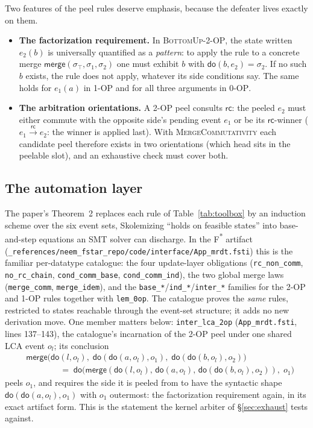 \documentclass[11pt]{article}
\newcommand{\rc}{\xrightarrow{\mathsf{rc}}}
\newcommand{\rcrel}{\mathsf{rc}}
\newcommand{\mergeL}{\mathsf{merge}}
\newcommand{\lean}[1]{\texttt{#1}}
\begin{document}
Two features of the peel rules deserve emphasis, because the defeater
lives exactly on them.

\begin{itemize}[leftmargin=2em]
\item \textbf{The factorization requirement.} In
  \textsc{BottomUp-2-OP}, the state written $e_2(b)$ is universally
  quantified as a \emph{pattern}: to apply the rule to a concrete merge
  $\mergeL(\sigma_\top, \sigma_1, \sigma_2)$ one must exhibit $b$ with
  $\mathsf{do}(b, e_2) = \sigma_2$. If no such $b$ exists, the rule
  does not apply, whatever its side conditions say. The same holds for
  $e_1(a)$ in \textsc{1-OP} and for all three arguments in
  \textsc{0-OP}.
\item \textbf{The arbitration orientations.} A \textsc{2-OP} peel
  consults $\rcrel$: the peeled $e_2$ must either commute with the
  opposite side's pending event $e_1$ or be its $\rcrel$-winner
  ($e_1 \rc e_2$: the winner is applied last). With
  \textsc{MergeCommutativity} each candidate peel therefore exists in
  two orientations (which head sits in the peelable slot), and an
  exhaustive check must cover both.
\end{itemize}

\subsection{The automation layer}

The paper's Theorem~2 replaces each rule of Table~\ref{tab:toolbox} by
an induction scheme over the six event sets, Skolemizing ``holds on
feasible states'' into base-and-step equations an SMT solver can
discharge. In the F\textsuperscript{*} artifact
(\lean{\_references/neem\_fstar\_repo/code/interface/App\_mrdt.fsti})
this is the familiar per-datatype catalogue: the four update-layer
obligations (\lean{rc\_non\_comm}, \lean{no\_rc\_chain},
\lean{cond\_comm\_base}, \lean{cond\_comm\_ind}), the two global merge
laws (\lean{merge\_comm}, \lean{merge\_idem}), and the
\lean{base\_*}/\lean{ind\_*}/\lean{inter\_*} families for the
\textsc{2-OP} and \textsc{1-OP} rules together with \lean{lem\_0op}.
The catalogue proves the \emph{same} rules, restricted to states
reachable through the event-set structure; it adds no new derivation
move. One member matters below: \lean{inter\_lca\_2op}
(\lean{App\_mrdt.fsti}, lines 137--143), the catalogue's incarnation of
the \textsc{2-OP} peel under one shared LCA event $o_l$; its conclusion
\begin{align*}
  &\mergeL\bigl(\mathsf{do}(l, o_l),\;
    \mathsf{do}(\mathsf{do}(a, o_l), o_1),\;
    \mathsf{do}(\mathsf{do}(b, o_l), o_2)\bigr) \\
  &\qquad\qquad =\;
  \mathsf{do}\bigl(\mergeL(\mathsf{do}(l, o_l),\,
    \mathsf{do}(a, o_l),\,
    \mathsf{do}(\mathsf{do}(b, o_l), o_2)),\; o_1\bigr)
\end{align*}
peels $o_1$, and requires the side it is peeled from to have the
syntactic shape $\mathsf{do}(\mathsf{do}(a, o_l), o_1)$ with $o_1$
outermost: the factorization requirement again, in its exact artifact
form. This is the statement the kernel arbiter of \S\ref{sec:exhaust}
tests against.
\end{document}
